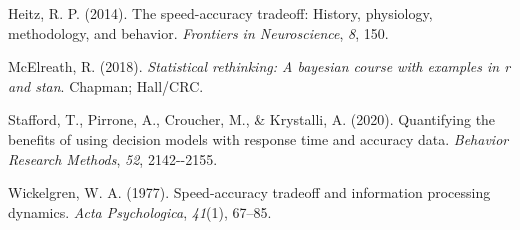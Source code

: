 \documentclass[
  english,
  ,jou,floatsintext]{apa6}
\newlength{\cslhangindent}
\newlength{\cslentryspacingunit} %
\newenvironment{CSLReferences}[2] %
 {%
  \setlength{\parindent}{0pt}
  \ifodd #1
  \let\oldpar\par
  \def\par{\hangindent=\cslhangindent\oldpar}
  \fi
  \setlength{\parskip}{#2\cslentryspacingunit}
 }%
 {}
\begin{document}
\hypertarget{refs}{}
\begin{CSLReferences}{1}{0}
\leavevmode{}%
Heitz, R. P. (2014). The speed-accuracy tradeoff: History, physiology, methodology, and behavior. \emph{Frontiers in Neuroscience}, \emph{8}, 150.

\leavevmode{}%
McElreath, R. (2018). \emph{Statistical rethinking: A bayesian course with examples in r and stan}. Chapman; Hall/CRC.

\leavevmode{}%
Stafford, T., Pirrone, A., Croucher, M., \& Krystalli, A. (2020). Quantifying the benefits of using decision models with response time and accuracy data. \emph{Behavior Research Methods}, \emph{52}, 2142-\/-2155.

\leavevmode{}%
Wickelgren, W. A. (1977). Speed-accuracy tradeoff and information processing dynamics. \emph{Acta Psychologica}, \emph{41}(1), 67--85.

\end{CSLReferences}
\end{document}
